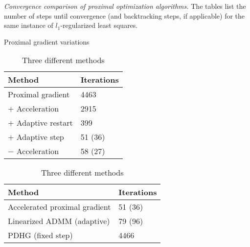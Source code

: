 \begin{table}
 \renewcommand{\arraystretch}{1.2}
 \caption[Convergence comparison of proximal optimization algorithms]{\emph{Convergence comparison of proximal optimization algorithms.} The tables list the number of steps until convergence (and backtracking steps, if applicable) for the same instance of $l_1$-regularized least squares.}
 \label{tab:prox_alg_comparison}
 \begin{subtable}[t]{0.4\textwidth}
  \centering
  \caption{Proximal gradient variations}
  \label{tab:proximal_gradient}
  \begin{tabular}{@{}ll@{}}
   \toprule
   Method & Iterations\\
   \midrule
   Proximal gradient & 4463\\
   $+$ Acceleration & 2915\\
   $+$ Adaptive restart & 399\\
   $+$ Adaptive step & 51 (36)\\
   $-$ Acceleration & 58 (27)\\
   \bottomrule
  \end{tabular}
 \end{subtable}%
 \begin{subtable}[t]{0.6\textwidth}
  \centering
  \caption{Three different methods}
  \label{tab:prox_algorithms}
  \begin{tabular}{@{}ll@{}}
   \toprule
   Method & Iterations\\
   \midrule
   Accelerated proximal gradient & 51 (36)\\
   Linearized ADMM (adaptive) & 79 (96)\\
   PDHG (fixed step) & 4466\\
   \bottomrule
  \end{tabular}
 \end{subtable}
\end{table}%

